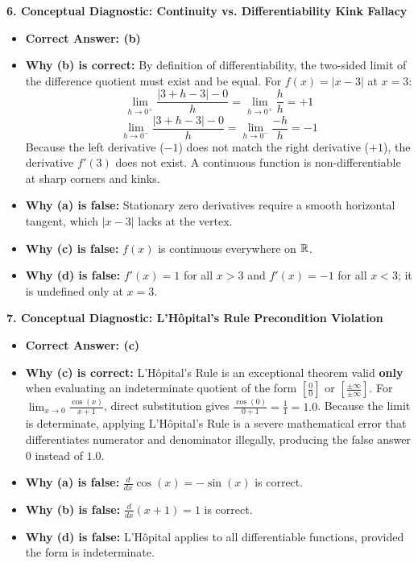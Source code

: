 \textbf{6. Conceptual Diagnostic: Continuity vs. Differentiability Kink Fallacy}
\begin{itemize}
    \item \textbf{Correct Answer: (b)}
    \item \textbf{Why (b) is correct:} By definition of differentiability, the two-sided limit of the difference quotient must exist and be equal. For $f(x) = |x - 3|$ at $x = 3$:
    $$\lim_{h \to 0^+} \frac{|3+h - 3| - 0}{h} = \lim_{h \to 0^+} \frac{h}{h} = +1$$
    $$\lim_{h \to 0^-} \frac{|3+h - 3| - 0}{h} = \lim_{h \to 0^-} \frac{-h}{h} = -1$$
    Because the left derivative ($-1$) does not match the right derivative ($+1$), the derivative $f'(3)$ does not exist. A continuous function is non-differentiable at sharp corners and kinks.
    \item \textbf{Why (a) is false:} Stationary zero derivatives require a smooth horizontal tangent, which $|x-3|$ lacks at the vertex.
    \item \textbf{Why (c) is false:} $f(x)$ is continuous everywhere on $\mathbb{R}$.
    \item \textbf{Why (d) is false:} $f'(x) = 1$ for all $x > 3$ and $f'(x) = -1$ for all $x < 3$; it is undefined only at $x = 3$.
\end{itemize}

\textbf{7. Conceptual Diagnostic: L'Hôpital's Rule Precondition Violation}
\begin{itemize}
    \item \textbf{Correct Answer: (c)}
    \item \textbf{Why (c) is correct:} L'Hôpital's Rule is an exceptional theorem valid \textbf{only} when evaluating an indeterminate quotient of the form $\left[\frac{0}{0}\right]$ or $\left[\frac{\pm\infty}{\pm\infty}\right]$. For $\lim_{x \to 0} \frac{\cos(x)}{x + 1}$, direct substitution gives $\frac{\cos(0)}{0 + 1} = \frac{1}{1} = 1.0$. Because the limit is determinate, applying L'Hôpital's Rule is a severe mathematical error that differentiates numerator and denominator illegally, producing the false answer $0$ instead of $1.0$.
    \item \textbf{Why (a) is false:} $\frac{d}{dx}\cos(x) = -\sin(x)$ is correct.
    \item \textbf{Why (b) is false:} $\frac{d}{dx}(x + 1) = 1$ is correct.
    \item \textbf{Why (d) is false:} L'Hôpital applies to all differentiable functions, provided the form is indeterminate.
\end{itemize}

